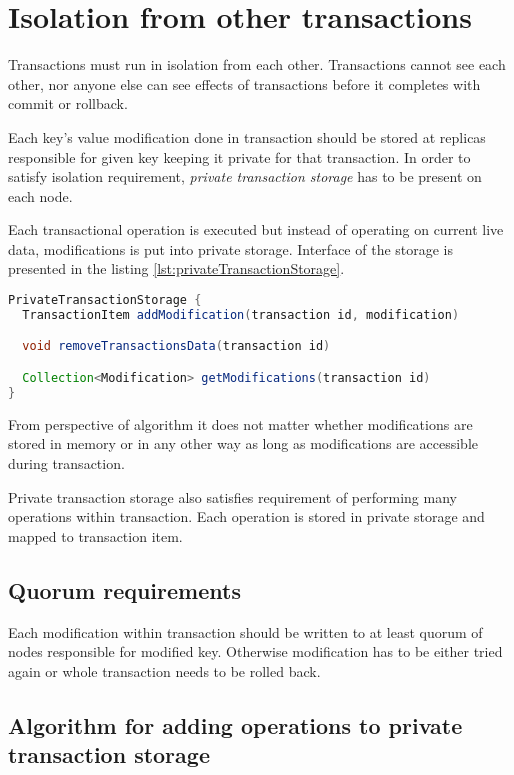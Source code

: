 
\section{Isolation from other transactions}
Transactions must run in isolation from each other. Transactions cannot see each other, nor anyone else can see effects of transactions before it completes with commit or rollback.

Each key's value modification done in transaction should be stored at replicas responsible for given key keeping it private for that transaction. In order to satisfy isolation requirement, \emph{private transaction storage} has to be present on each node.

Each transactional operation is executed but instead of operating on current live data, modifications is put into private storage. Interface of the storage is presented in the listing \ref{lst:privateTransactionStorage}.

\begin{lstlisting}[language=Java,style=outcode,label={lst:privateTransactionStorage},caption={API of private transaction storage}]
PrivateTransactionStorage {
  TransactionItem addModification(transaction id, modification)

  void removeTransactionsData(transaction id)

  Collection<Modification> getModifications(transaction id)        
}

\end{lstlisting}


From perspective of algorithm it does not matter whether modifications are stored in memory or in any other way as long as modifications are accessible during transaction.

Private transaction storage also satisfies requirement of performing many operations within transaction. Each operation is stored in private storage and mapped to transaction item.


\subsection{Quorum requirements}
Each modification within transaction should be written to at least quorum of nodes responsible for modified key. Otherwise modification has to be either tried again or whole transaction needs to be rolled back.


\subsection{Algorithm for adding operations to private transaction storage}


